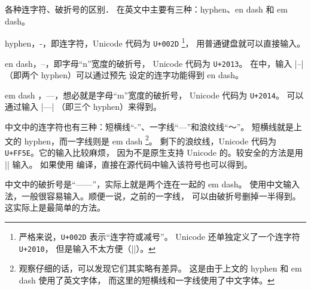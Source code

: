 \begin{myQA}{各种连字符、破折号的区别．}
	在英文中主要有三种：hyphen、en dash 和 em dash。
	
	\begin{myItemize}
		\item  hyphen，-，即连字符，Unicode 代码为 \texttt{U+002D}
			\footnote{严格来说，\texttt{U+002D} 表示“连字符或减号”。
				Unicode 还单独定义了一个连字符 \texttt{U+2010}，
				但是输入不太方便（\code||）。}，
			用普通键盘就可以直接输入。
		\item en dash，--，即字母“n”宽度的破折号，
			Unicode 代码为 \texttt{U+2013}。
			在\LaTeXTeX 中，输入 \code|--| （即两个 hyphen）可以通过预先
			设定的连字功能得到 en dash。
		\item em dash ，---，想必就是字母“m”宽度的破折号，
			Unicode 代码为 \texttt{U+2014}。
			可以通过输入 \code|---| （即三个 hyphen）来得到。
	\end{myItemize}
	
	\blankline
	
	中文中的连字符也有三种：短横线“{\Songti -}”、一字线“—”和浪纹线“～”。
	短横线就是上文的 hyphen，而一字线则是 em dash
	\footnote{观察仔细的话，可以发现它们其实略有差异。
		这是由于上文的 hyphen 和 em dash 使用了英文字体，
		而这里的短横线和一字线使用了中文字体。}。
	剩下的浪纹线，Unicode 代码为 \texttt{U+FF5E}。它的输入比较麻烦，
	因为\LaTeXTeX 不是原生支持 Unicode 的。较安全的方法是用
	\code|| 输入。
	如果使用  编译，直接在源代码中输入该符号也可以得到。
	
	中文中的破折号是“——”，实际上就是两个连在一起的 em dash。
	使用中文输入法，一般很容易输入。顺便一说，之前的一字线，
	可以由破折号删掉一半得到。这实际上是最简单的方法。
\end{myQA}

